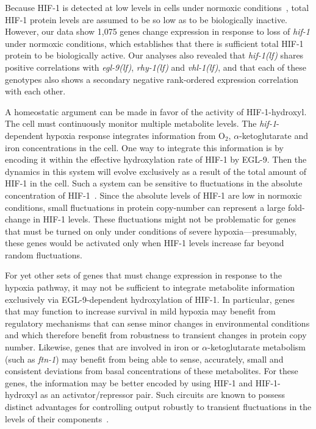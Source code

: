 \documentclass[9pt,twocolumn,twoside]{pnas-new}
\newcommand{\gene}[1]{\mbox{\emph{#1}}}
\newcommand{\ftna}{\gene{ftn-1}}
\newcommand{\egl}{\gene{egl-9(lf)}}
\newcommand{\rhy}{\gene{rhy-1(lf)}}
\newcommand{\vhl}{\gene{vhl-1(lf)}}
\newcommand{\hif}{\gene{hif-1(lf)}}
\newcommand{\eglp}{EGL-9}
\newcommand{\hifp}{HIF-1}
\newcommand{\hifn}{1,075}
\begin{document}
Because \hifp{} is detected at low levels in cells under normoxic
conditions~\cite{Wang1993}, total \hifp{} protein levels are assumed to be so
low as to be biologically inactive. However, our data show \hifn{} genes change
expression in response to loss of \gene{hif-1} under normoxic conditions, which
establishes that there is sufficient total \hifp{} protein to be biologically
active. Our analyses also revealed that \hif{} shares positive correlations with
\egl{}, \rhy{} and \vhl{}, and that each of these genotypes also shows a
secondary negative rank-ordered expression correlation with each other.


A homeostatic argument can be made in favor of the activity of \hifp{}-hydroxyl.
The cell must continuously monitor multiple metabolite levels. The
\gene{hif-1}-dependent hypoxia response integrates information from O$_2$,
$\alpha$-ketoglutarate and iron concentrations in the cell. One
way to integrate this information is by encoding it within the effective
hydroxylation rate of \hifp{} by \eglp{}. Then the dynamics in this system will
evolve exclusively as a result of the total amount of \hifp{} in the cell. Such
a system can be sensitive to fluctuations in the absolute concentration of
\hifp{}~\cite{Goentoro2009a}. Since the absolute levels of \hifp{} are low in
normoxic conditions, small fluctuations in protein copy-number can represent a
large fold-change in \hifp{} levels. These fluctuations might not be problematic
for genes that must be turned on only under conditions of severe
hypoxia---presumably, these genes would be activated only when \hifp{} levels
increase far beyond random fluctuations.

For yet other sets of genes that must change expression in response to the
hypoxia pathway, it may not be sufficient to integrate metabolite
information exclusively via \eglp{}-dependent hydroxylation of \hifp{}. In
particular, genes that may function to increase survival in mild hypoxia may
benefit from regulatory mechanisms that can sense minor changes in environmental
conditions and which therefore benefit from robustness to transient changes in
protein copy number. Likewise, genes that are involved in iron or
$\alpha$-ketoglutarate metabolism (such as \ftna{}) may benefit from being able
to sense, accurately, small and consistent deviations from basal concentrations
of these metabolites. For these genes, the information may be better encoded by
using \hifp{} and \hifp{}-hydroxyl as an activator/repressor pair. Such circuits
are known to possess distinct advantages for controlling output robustly to
transient fluctuations in the levels of their
components~\cite{Hart2012,Hart2013}.
\end{document}
